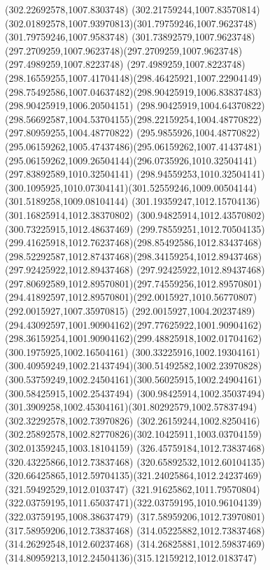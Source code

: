 {{	\lineto(302.22692578,1007.8303748)
	\curveto(302.21759244,1007.83570814)(302.01892578,1007.93970813)(301.79759246,1007.9623748)
	\lineto(301.79759246,1007.9583748)
	\curveto(301.73892579,1007.9623748)(297.2709259,1007.9623748)(297.2709259,1007.9623748)
	\lineto(297.4989259,1007.8223748)
	\curveto(297.4989259,1007.8223748)(298.16559255,1007.41704148)(298.46425921,1007.22904149)
	\curveto(298.75492586,1007.04637482)(298.90425919,1006.83837483)(298.90425919,1006.20504151)
	\lineto(298.90425919,1004.64370822)
	\curveto(298.56692587,1004.53704155)(298.22159254,1004.48770822)(297.80959255,1004.48770822)
	\curveto(295.9855926,1004.48770822)(295.06159262,1005.47437486)(295.06159262,1007.41437481)
	\curveto(295.06159262,1009.26504144)(296.0735926,1010.32504141)(297.83892589,1010.32504141)
	\curveto(298.94559253,1010.32504141)(300.1095925,1010.07304141)(301.52559246,1009.00504144)
	\lineto(301.5189258,1009.08104144)
	\lineto(301.19359247,1012.15704136)
	\lineto(301.16825914,1012.38370802)
	\lineto(300.94825914,1012.43570802)
	\lineto(300.73225915,1012.48637469)
	\curveto(299.78559251,1012.70504135)(299.41625918,1012.76237468)(298.85492586,1012.83437468)
	\curveto(298.52292587,1012.87437468)(298.34159254,1012.89437468)(297.92425922,1012.89437468)
	\curveto(297.92425922,1012.89437468)(297.80692589,1012.89570801)(297.74559256,1012.89570801)
	\curveto(294.41892597,1012.89570801)(292.0015927,1010.56770807)(292.0015927,1007.35970815)
	\curveto(292.0015927,1004.20237489)(294.43092597,1001.90904162)(297.77625922,1001.90904162)
	\curveto(298.36159254,1001.90904162)(299.48825918,1002.01704162)(300.1975925,1002.16504161)
	\curveto(300.33225916,1002.19304161)(300.40959249,1002.21437494)(300.51492582,1002.23970828)
	\curveto(300.53759249,1002.24504161)(300.56025915,1002.24904161)(300.58425915,1002.25437494)
	\curveto(300.98425914,1002.35037494)(301.3909258,1002.45304161)(301.80292579,1002.57837494)
	\lineto(302.32292578,1002.73970826)
	\lineto(302.26159244,1002.8250416)
	\curveto(302.25892578,1002.82770826)(302.10425911,1003.03704159)(302.01359245,1003.18104159)
	\moveto(326.45759184,1012.73837468)
	\lineto(320.43225866,1012.73837468)
	\lineto(320.65892532,1012.60104135)
	\curveto(320.66425865,1012.59704135)(321.24025864,1012.24237469)(321.59492529,1012.0103747)
	\curveto(321.91625862,1011.79570804)(322.03759195,1011.65037471)(322.03759195,1010.96104139)
	\lineto(322.03759195,1008.38637479)
	\lineto(317.58959206,1012.73970801)
	\lineto(317.58959206,1012.73837468)
	\lineto(314.05225882,1012.73837468)
	\lineto(314.26292548,1012.60237468)
	\curveto(314.26825881,1012.59837469)(314.80959213,1012.24504136)(315.12159212,1012.0183747)
}}
